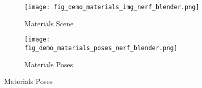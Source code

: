 \begin{figure}[H]
    \centering
    \begin{subfigure}{0.48\linewidth}
        \texttt{[image: fig\_demo\_materials\_img\_nerf\_blender.png]}
        \caption{Materials Scene}
    \end{subfigure}
    \begin{subfigure}{0.48\linewidth}
        \texttt{[image: fig\_demo\_materials\_poses\_nerf\_blender.png]}
        \caption{Materials Poses}
    \end{subfigure}
    \label{fig:dataset_nerf_blender_material}
\end{figure}
